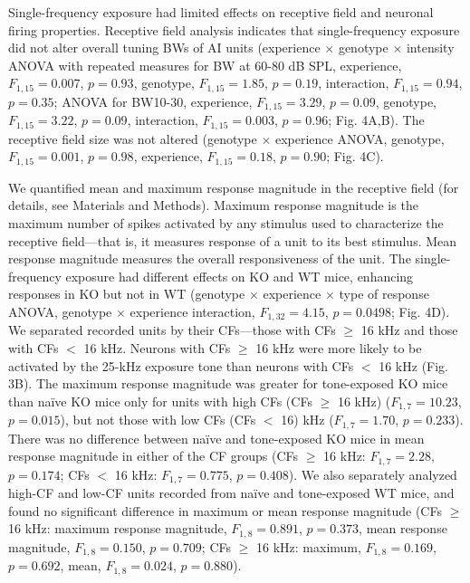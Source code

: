 Single-frequency exposure had limited effects on receptive field and neuronal firing properties. Receptive field analysis indicates that single-frequency exposure did not alter overall tuning BWs of AI units (experience $\times$ genotype $\times$ intensity ANOVA with repeated measures for BW at 60-80 dB SPL, experience, $F_{1,15}=0.007$, $p=0.93$, genotype, $F_{1,15}=1.85$, $p=0.19$, interaction, $F_{1,15}=0.94$, $p=0.35$; ANOVA for BW10-30, experience, $F_{1,15}=3.29$, $p=0.09$, genotype, $F_{1,15}=3.22$, $p=0.09$, interaction, $F_{1,15}=0.003$, $p=0.96$; Fig. 4A,B). The receptive field size was not altered (genotype $\times$ experience ANOVA, genotype, $F_{1,15}=0.001$, $p=0.98$, experience, $F_{1,15}=0.18$, $p=0.90$; Fig. 4C).

We quantified mean and maximum response magnitude in the receptive field (for details, see Materials and Methods). Maximum response magnitude is the maximum number of spikes activated by any stimulus used to characterize the receptive field---that is, it measures response of a unit to its best stimulus. Mean response magnitude measures the overall responsiveness of the unit. The single-frequency exposure had different effects on KO and WT mice, enhancing responses in KO but not in WT (genotype $\times$ experience $\times$ type of response ANOVA, genotype $\times$ experience interaction, $F_{1,32}=4.15$, $p=0.0498$; Fig. 4D). We separated recorded units by their CFs---those with CFs $\ge$ 16 kHz and those with CFs $<$ 16 kHz. Neurons with CFs $\ge$ 16 kHz were more likely to be activated by the 25-kHz exposure tone than neurons with CFs $<$ 16 kHz (Fig. 3B). The maximum response magnitude was greater for tone-exposed KO mice than na\"ive KO mice only for units with high CFs (CFs $\ge$ 16 kHz) ($F_{1,7}=10.23$, $p=0.015$), but not those with low CFs (CFs $<$ 16) kHz ($F_{1,7}=1.70$, $p=0.233$). There was no difference between na\"ive and tone-exposed KO mice in mean response magnitude in either of the CF groups (CFs $\ge$ 16 kHz: $F_{1,7}=2.28$, $p=0.174$; CFs $<$ 16 kHz: $F_{1,7}=0.775$, $p=0.408$). We also separately analyzed high-CF and low-CF units recorded from na\"ive and tone-exposed WT mice, and found no significant difference in maximum or mean response magnitude (CFs $\ge$ 16 kHz: maximum response magnitude, $F_{1,8}=0.891$, $p=0.373$, mean response magnitude, $F_{1,8}=0.150$, $p=0.709$; CFs $\ge$ 16 kHz: maximum, $F_{1,8}=0.169$, $p=0.692$, mean, $F_{1,8}=0.024$, $p=0.880$).

